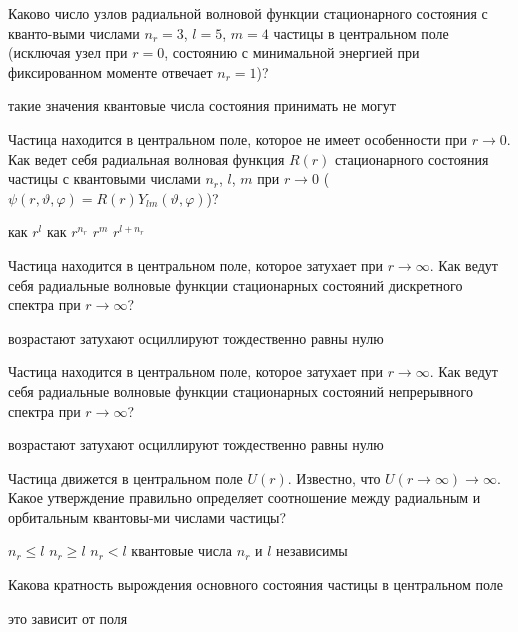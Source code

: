 \documentclass[11pt,a4paper]{exam}
\begin{document}
\begin{questions}
\question Каково число узлов радиальной волновой функции стационарного состояния с кванто-выми числами ${n_r} = 3$, $l = 5$, $m = 4$ частицы в центральном поле (исключая узел при $r = 0$, состоянию с минимальной энергией при фиксированном моменте отвечает ${n_r} = 1$)?
\begin{choices}
\choice такие значения квантовые числа состояния принимать не могут
\end{choices}

\question Частица находится в центральном поле, которое не имеет особенности при $r \to 0$. Как ведет себя радиальная волновая функция $R(r)$ стационарного состояния частицы с квантовыми числами ${n_r}$, $l$, $m$ при $r \to 0$ ($\psi (r,\vartheta ,\varphi ) = R(r){Y_{lm}}(\vartheta ,\varphi )$)?
\begin{choices}
\choice как ${r^l}$    
\choice как ${r^{{n_r}}}$    
\choice ${r^m}$     
\choice ${r^{l + {n_r}}}$
\end{choices}

\question Частица находится в центральном поле, которое затухает при $r \to \infty $. Как ведут себя радиальные волновые функции стационарных состояний дискретного спектра при $r \to \infty $?
\begin{choices}
\choice возрастают     
\choice затухают
\choice осциллируют    
\choice тождественно равны нулю
\end{choices}

\question Частица находится в центральном поле, которое затухает при $r \to \infty $. Как ведут себя радиальные волновые функции стационарных состояний непрерывного спектра при $r \to \infty $?
\begin{choices}
\choice возрастают     
\choice затухают
\choice осциллируют    
\choice тождественно равны нулю
\end{choices}

\question Частица движется в центральном поле $U(r)$. Известно, что $U(r \to \infty ) \to \infty $. Какое утверждение правильно определяет соотношение между радиальным и орбитальным квантовы-ми числами частицы?
\begin{choices}
\choice ${n_r} \le l$  
\choice ${n_r} \ge l$  
\choice ${n_r} < l$ 
\choice квантовые числа ${n_r}$ и $l$ независимы
\end{choices}

\question Какова кратность вырождения основного состояния частицы в центральном поле
\begin{choices}
\choice это зависит от поля
\end{choices}


\end{questions}
\end{document}
